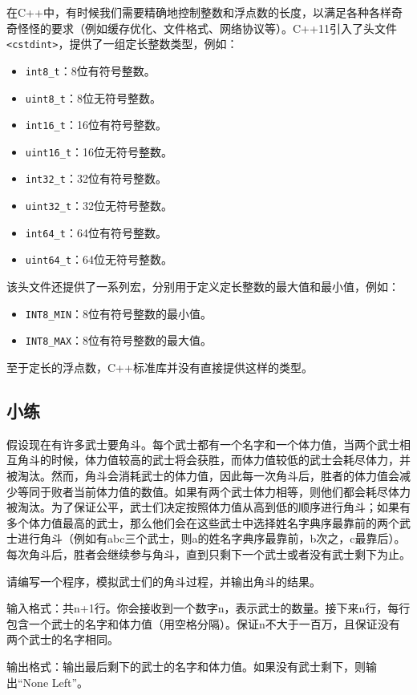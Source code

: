 \documentclass[../main.tex]{subfiles}
\begin{document}
在C++中，有时候我们需要精确地控制整数和浮点数的长度，以满足各种各样奇奇怪怪的要求（例如缓存优化、文件格式、网络协议等）。C++11引入了头文件\texttt{<cstdint>}，提供了一组定长整数类型，例如：
\begin{itemize}
  \item \texttt{int8\_t}：8位有符号整数。
  \item \texttt{uint8\_t}：8位无符号整数。
  \item \texttt{int16\_t}：16位有符号整数。
  \item \texttt{uint16\_t}：16位无符号整数。
  \item \texttt{int32\_t}：32位有符号整数。
  \item \texttt{uint32\_t}：32位无符号整数。
  \item \texttt{int64\_t}：64位有符号整数。
  \item \texttt{uint64\_t}：64位无符号整数。
\end{itemize}
该头文件还提供了一系列宏，分别用于定义定长整数的最大值和最小值，例如：
\begin{itemize}
  \item \texttt{INT8\_MIN}：8位有符号整数的最小值。
  \item \texttt{INT8\_MAX}：8位有符号整数的最大值。
\end{itemize}

至于定长的浮点数，C++标准库并没有直接提供这样的类型。

\subsection{小练}

\begin{example}
  假设现在有许多武士要角斗。每个武士都有一个名字和一个体力值，当两个武士相互角斗的时候，体力值较高的武士将会获胜，而体力值较低的武士会耗尽体力，并被淘汰。然而，角斗会消耗武士的体力值，因此每一次角斗后，胜者的体力值会减少等同于败者当前体力值的数值。如果有两个武士体力相等，则他们都会耗尽体力被淘汰。为了保证公平，武士们决定按照体力值从高到低的顺序进行角斗；如果有多个体力值最高的武士，那么他们会在这些武士中选择姓名字典序最靠前的两个武士进行角斗（例如有abc三个武士，则a的姓名字典序最靠前，b次之，c最靠后）。每次角斗后，胜者会继续参与角斗，直到只剩下一个武士或者没有武士剩下为止。

  请编写一个程序，模拟武士们的角斗过程，并输出角斗的结果。

  输入格式：共n+1行。你会接收到一个数字n，表示武士的数量。接下来n行，每行包含一个武士的名字和体力值（用空格分隔）。保证n不大于一百万，且保证没有两个武士的名字相同。

  输出格式：输出最后剩下的武士的名字和体力值。如果没有武士剩下，则输出“None Left”。
\end{example}
\end{document}
